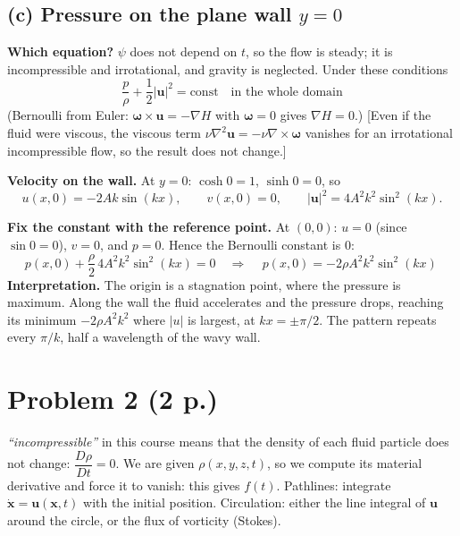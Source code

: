 \documentclass[11pt]{article}
\newcommand{\bu}{\mathbf u}
\newcommand{\bo}{\boldsymbol\omega}
\newcommand{\kw}[1]{{\color{kw}\itshape ``#1''}}
\newcommand{\why}[1]{{\color{gray}\small[#1]}}
\begin{document}
\subsection*{(c) Pressure on the plane wall $y=0$}
\textbf{Which equation?} $\psi$ does not depend on $t$, so the flow is steady; it is incompressible and irrotational, and gravity is neglected. Under these conditions
\[
\frac{p}{\rho}+\frac12|\bu|^2=\text{const}\quad\text{in the whole domain}
\]
(Bernoulli from Euler: $\bo\times\bu=-\nabla H$ with $\bo=0$ gives $\nabla H=0$.)
\why{Even if the fluid were viscous, the viscous term $\nu\nabla^2\bu=-\nu\nabla\times\bo$ vanishes for an irrotational incompressible flow, so the result does not change.}

\textbf{Velocity on the wall.} At $y=0$: $\cosh 0=1$, $\sinh 0=0$, so
\[
u(x,0)=-2Ak\sin(kx),\qquad v(x,0)=0,\qquad |\bu|^2=4A^2k^2\sin^2(kx).
\]

\textbf{Fix the constant with the reference point.} At $(0,0)$: $u=0$ (since $\sin 0=0$), $v=0$, and $p=0$. Hence the Bernoulli constant is $0$:
\[
p(x,0)+\frac{\rho}{2}\,4A^2k^2\sin^2(kx)=0
\quad\Longrightarrow\quad
\boxed{\,p(x,0)=-2\rho A^2k^2\sin^2(kx)\,}
\]
\textbf{Interpretation.} The origin is a stagnation point, where the pressure is maximum. Along the wall the fluid accelerates and the pressure drops, reaching its minimum $-2\rho A^2k^2$ where $|u|$ is largest, at $kx=\pm\pi/2$. The pattern repeats every $\pi/k$, half a wavelength of the wavy wall.

\section*{Problem 2 \normalsize(2 p.)}

\begin{strategy}
\kw{incompressible} in this course means that the density of each fluid particle does not change: $\dfrac{D\rho}{Dt}=0$. We are given $\rho(x,y,z,t)$, so we compute its material derivative and force it to vanish: this gives $f(t)$.
Pathlines: integrate $\dot{\mathbf x}=\bu(\mathbf x,t)$ with the initial position.
Circulation: either the line integral of $\bu$ around the circle, or the flux of vorticity (Stokes).
\end{strategy}
\end{document}
